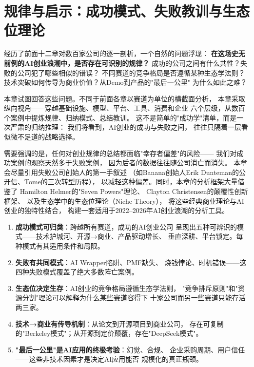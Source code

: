
\chapter{规律与启示：成功模式、失败教训与生态位理论}
\label{ch:patterns}


经历了前面十二章对数百家公司的逐一剖析，一个自然的问题浮现：
\textbf{在这场史无前例的AI创业浪潮中，是否存在可识别的规律？}
成功的公司之间有什么共性？失败的公司犯了哪些相似的错误？
不同赛道的竞争格局是否遵循某种生态学法则？
技术突破如何传导为商业价值？从Demo到产品的"最后一公里"
为什么如此之难？

本章试图回答这些问题。不同于前面各章以赛道为单位的横截面分析，
本章采取纵向视角——穿越基础设施、模型、平台、工具、消费和企业
六个层级，从数百个案例中提炼规律、归纳模式、总结教训。
这不是简单的"成功学"清单，而是一次严肃的归纳推理：
我们将看到，AI创业的成功与失败之间，
往往只隔着一层看似微不足道的战略选择。

需要强调的是，任何对创业规律的总结都面临"幸存者偏差"的风险——
我们对成功案例的观察天然多于失败案例，
因为后者的数据往往随公司消亡而消失。
本章会尽量引用失败公司创始人的第一手叙述
（如Banana创始人Erik Dunteman的公开信、Tome的三次转型历程），
以减轻这种偏差。同时，本章的分析框架大量借鉴了
Hamilton Helmer的"Seven Powers"理论、
Clayton Christensen的颠覆性创新框架、
以及生态学中的生态位理论（Niche Theory），
将这些经典商业理论与AI创业的独特性结合，
构建一套适用于2022--2026年AI创业浪潮的分析工具。

\begin{corebox}
\begin{enumerate}
  \item \textbf{成功模式可归类}：跨越所有赛道，成功的AI创业公司
    呈现出五种可辨识的模式——技术护城河、开源→商业、产品驱动增长、
    垂直深耕、平台锁定。每种模式有其适用条件和局限。
  \item \textbf{失败有共同模式}：AI Wrapper陷阱、PMF缺失、
    烧钱悖论、时机错误——这四种失败模式覆盖了绝大多数阵亡案例。
  \item \textbf{生态位决定生存}：AI创业的竞争格局遵循生态学法则，
    "竞争排斥原则"和"资源分割"理论可以解释为什么某些赛道容得下
    十家公司而另一些赛道只能存活两三家。
  \item \textbf{技术→商业有传导机制}：从论文到开源项目到商业公司，
    存在可复制的"Berkeley模式"；从开源到定价颠覆，存在"DeepSeek模式"。
  \item \textbf{"最后一公里"是AI应用的终极考验}：幻觉、合规、
    企业采购周期、用户信任——这些非技术因素才是决定AI应用能否
    规模化的真正瓶颈。
\end{enumerate}
\end{corebox}


